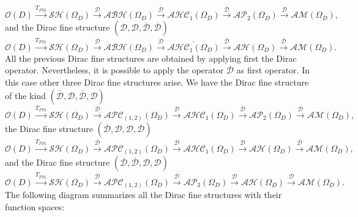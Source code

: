 \documentclass[reqno,11pt]{amsart}
\numberwithin{equation}{section}
\theoremstyle{definition}
\begin{document}
$$ \mathcal{O}(D) \overset{T_{FS1}}{\longrightarrow} \mathcal{SH}(\Omega_D)\overset{\mathcal{D}}{\longrightarrow} \mathcal{ABH}(\Omega_D)\overset{\mathcal{\overline{D}}}{\longrightarrow}	\mathcal{AHC}_1(\Omega_D) \overset{\mathcal{\overline{D}}}{\longrightarrow} \mathcal{AP}_2(\Omega_D) \overset{\mathcal{D}}{\longrightarrow} \mathcal{AM}(\Omega_D),$$
and the Dirac fine structure $(\mathcal{D}, \mathcal{D}, \mathcal{\overline{D}}, \mathcal{\overline{D}}  )$
$$ \mathcal{O}(D) \overset{T_{FS1}}{\longrightarrow} \mathcal{SH}(\Omega_D)\overset{\mathcal{D}}{\longrightarrow} \mathcal{ABH}(\Omega_D)\overset{\mathcal{D}}{\longrightarrow}\overline{\mathcal{AHC}_1(\Omega_D)} \overset{\mathcal{\overline{D}}}{\longrightarrow} \mathcal{AH}(\Omega_D) \overset{\mathcal{\overline{D}}}{\longrightarrow} \mathcal{AM}(\Omega_D).$$
All the previous Dirac fine structures are obtained by applying first the Dirac operator. Nevertheless, it is possible to apply the operator $ \mathcal{\overline{D}}$ as  first operator. In this case other three Dirac fine structures arise. We have the Dirac fine structure of the kind $(\mathcal{\overline{D}}, \mathcal{D}, \mathcal{\overline{D}},\mathcal{D} )$
$$ \mathcal{O}(D) \overset{T_{FS1}}{\longrightarrow} \mathcal{SH}(\Omega_D)\overset{\mathcal{\overline{D}}}{\longrightarrow} \mathcal{APC}_{(1,2)}(\Omega_D)\overset{\mathcal{D}}{\longrightarrow} \mathcal{AHC}_1(\Omega_D) \overset{\mathcal{\overline{D}}}{\longrightarrow} \mathcal{AP}_2(\Omega_D) \overset{\mathcal{D}}{\longrightarrow} \mathcal{AM}(\Omega_D),$$
the Dirac fine structure $(\mathcal{\overline{D}}, \mathcal{D},\mathcal{D},  \mathcal{\overline{D}} )$
$$ \mathcal{O}(D) \overset{T_{FS1}}{\longrightarrow} \mathcal{SH}(\Omega_D)\overset{\mathcal{\overline{D}}}{\longrightarrow} \mathcal{APC}_{(1,2)}(\Omega_D)\overset{\mathcal{D}}{\longrightarrow} \mathcal{AHC}_1(\Omega_D) \overset{\mathcal{D}}{\longrightarrow} \mathcal{AH}(\Omega_D) \overset{\mathcal{\overline{D}}}{\longrightarrow} \mathcal{AM}(\Omega_D),$$
and the Dirac fine structure $(\mathcal{\overline{D}},\mathcal{\overline{D}}, \mathcal{D},\mathcal{D})$
$$ \mathcal{O}(D) \overset{T_{FS1}}{\longrightarrow} \mathcal{SH}(\Omega_D)\overset{\mathcal{\overline{D}}}{\longrightarrow} \mathcal{APC}_{(1,2)}(\Omega_D)\overset{\mathcal{\overline{D}}}{\longrightarrow} \mathcal{AP}_3(\Omega_D) \overset{\mathcal{D}}{\longrightarrow} \mathcal{AH}(\Omega_D) \overset{\mathcal{D}}{\longrightarrow} \mathcal{AM}(\Omega_D).$$
The following diagram summarizes all the Dirac fine structures
with their function spaces:
\begin{figure}[H]
\centering
\resizebox{0.95\textwidth}{!}{%

}
\end{figure}
\end{document}
